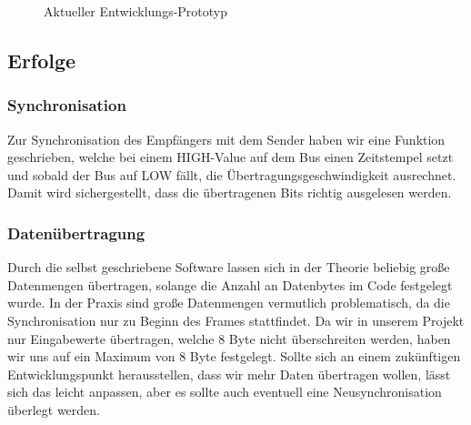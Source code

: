 \begin{figure}[H]
    \centering    
    \caption{Aktueller Entwicklungs-Prototyp}
    \label{prototyp}
\end{figure}

\subsection{Erfolge}
\subsubsection{Synchronisation}
Zur Synchronisation des Empfängers mit dem Sender haben wir eine Funktion geschrieben, welche bei einem HIGH-Value auf dem Bus einen Zeitstempel setzt und sobald der Bus auf LOW fällt, die Übertragungsgeschwindigkeit ausrechnet. Damit wird sichergestellt, dass die übertragenen Bits richtig ausgelesen werden.

\subsubsection{Datenübertragung}
Durch die selbst geschriebene Software lassen sich in der Theorie beliebig große Datenmengen übertragen, solange die Anzahl an Datenbytes im Code festgelegt wurde. In der Praxis sind große Datenmengen vermutlich problematisch, da die Synchronisation nur zu Beginn des Frames stattfindet. Da wir in unserem Projekt nur Eingabewerte übertragen, welche 8 Byte nicht überschreiten werden, haben wir uns auf ein Maximum von 8 Byte festgelegt. Sollte sich an einem zukünftigen Entwicklungspunkt herausstellen, dass wir mehr Daten übertragen wollen, lässt sich das leicht anpassen, aber es sollte auch eventuell eine Neusynchronisation überlegt werden. 

